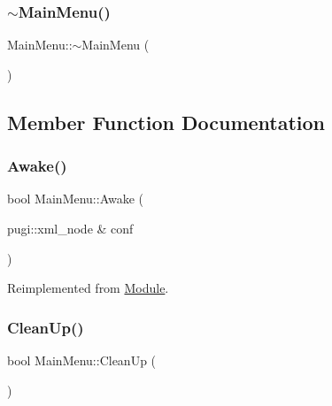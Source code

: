 \mbox{\label{class_main_menu_a0a19ddba3ac52bf39c09b579171c98f2}} 
\subsubsection{\texorpdfstring{$\sim$MainMenu()}{~MainMenu()}}
{\footnotesize\ttfamily Main\+Menu\+::$\sim$\+Main\+Menu (\begin{DoxyParamCaption}{ }\end{DoxyParamCaption})\hspace{0.3cm}{\ttfamily [virtual]}}



\subsection{Member Function Documentation}
\mbox{\label{class_main_menu_a0b45e9eb6945b2d26f54d708c24fb924}} 
\subsubsection{\texorpdfstring{Awake()}{Awake()}}
{\footnotesize\ttfamily bool Main\+Menu\+::\+Awake (\begin{DoxyParamCaption}\item[{pugi\+::xml\+\_\+node \&}]{conf }\end{DoxyParamCaption})\hspace{0.3cm}{\ttfamily [virtual]}}



Reimplemented from \mbox{\hyperlink{class_module_a4a283650cf8a73aa0b5599106bc2ba6c}{Module}}.

\mbox{\label{class_main_menu_a87852de56aa660cfd0c2f578f9114773}} 
\subsubsection{\texorpdfstring{CleanUp()}{CleanUp()}}
{\footnotesize\ttfamily bool Main\+Menu\+::\+Clean\+Up (\begin{DoxyParamCaption}{ }\end{DoxyParamCaption})\hspace{0.3cm}{\ttfamily [virtual]}}



